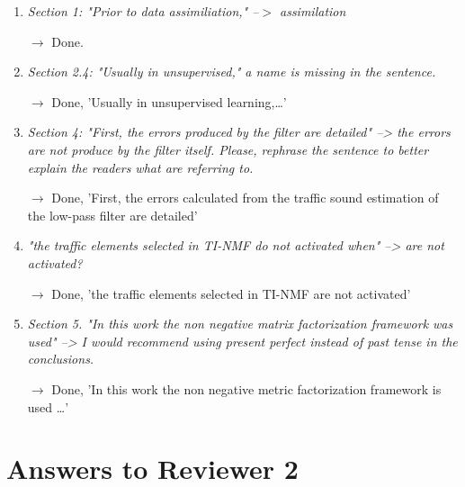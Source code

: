 \documentclass[10pt]{article}
\begin{document}
\begin{enumerate}
\item \emph{Section 1: "Prior to data assimiliation," --$>$ assimilation}

$\rightarrow$ Done.

\item \emph{Section 2.4: "Usually in unsupervised," a name is missing in the sentence.}

$\rightarrow$ Done, 'Usually in unsupervised learning,…'

\item \emph{Section 4: 
"First, the errors produced by the filter are detailed" --> the errors are not produce by the filter itself. Please, rephrase the sentence to better explain the readers what are referring to.}

$\rightarrow$ Done, 'First, the errors calculated from the traffic sound estimation of the low-pass filter are detailed'

\item \emph{"the traffic elements selected in TI-NMF do not activated when" --> are not activated?}

$\rightarrow$ Done, 'the traffic elements selected in TI-NMF are not activated'

\item \emph{Section 5. "In this work the non negative matrix factorization framework was used" --> I would recommend using present perfect instead of past tense in the conclusions.}

$\rightarrow$ Done, 'In this work the non negative metric factorization framework is used \dots'

\end{enumerate}

\section{Answers to Reviewer 2}
\end{document}
